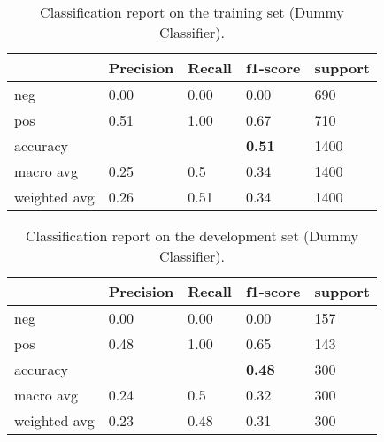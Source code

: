 \documentclass[10pt, a4paper]{article}
\begin{document}
	\begin{table}
		\begin{tabular}{|l|l|l|l|l|}
			\hline
			\cellcolor{blue!25}\textbf{} & \cellcolor{blue!25}\textbf{Precision} &
			\cellcolor{blue!25}\textbf{Recall}  &
			\cellcolor{blue!25}\textbf{f1-score}  &
			\cellcolor{blue!25}\textbf{support}\\
			\hline
			neg & 0.00 & 0.00 & 0.00 & 690 \\\hline
			pos & 0.51  & 1.00 & 0.67 & 710 \\\hline
			accuracy & & & \textbf{0.51} & 1400 \\\hline
			macro avg & 0.25 & 0.5 & 0.34 & 1400 \\\hline
			weighted avg & 0.26 & 0.51 & 0.34 & 1400 \\\hline
			
		\end{tabular}
		\centering
		\caption{Classification report on the training set (Dummy Classifier).}
		\label{tab::ex-1-report-train-dummy}
	\end{table}
	

 	\begin{table}
		\begin{tabular}{|l|l|l|l|l|}
			\hline
			\cellcolor{blue!25}\textbf{} & \cellcolor{blue!25}\textbf{Precision} &
			\cellcolor{blue!25}\textbf{Recall}  &
			\cellcolor{blue!25}\textbf{f1-score}  &
			\cellcolor{blue!25}\textbf{support}\\
			\hline
			neg & 0.00 & 0.00 & 0.00 & 157 \\\hline
			pos & 0.48  & 1.00 & 0.65 & 143 \\\hline
			accuracy & & & \textbf{0.48} & 300 \\\hline
			macro avg & 0.24 & 0.5 & 0.32 & 300 \\\hline
			weighted avg & 0.23 & 0.48 & 0.31 & 300 \\\hline
			
		\end{tabular}
		\centering
		\caption{Classification report on the development set (Dummy Classifier).}
		\label{tab::ex-1-report-dev-dummy}
	\end{table}
	
\end{document}
